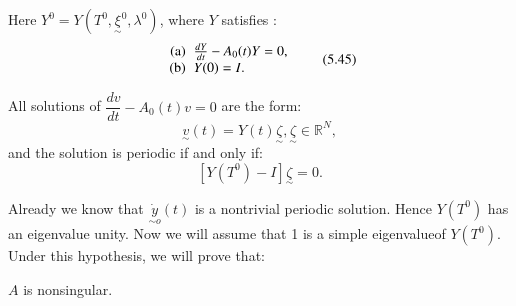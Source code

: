   Here $Y^0 =Y(T^0, \underset{\sim}{\xi}^0, \lambda^0)$, where $Y$
  satisfies : 
  \begin{equation*}
\begin{array}{r@{\;\;}l}
\text{(a)} & \frac{dY}{dt}- A_0(t)Y=0,\\
\text{(b)} & Y(0)=I. 
\end{array}\tag{5.45}\label{chap5-eq5.45}
  \end{equation*}
  
  All solutions of $\dfrac{dv}{dt}- A_0(t) v=0$ are the form: 
  $$
  \underset{\sim}{v}(t)= Y(t)\underset{\sim}{\zeta}, 
  \underset{\sim}{\zeta} \in \mathbb{R}^N,  
  $$
  and the solution is periodic if and only if:
  $$
  [Y(T^0)-I] \underset{\sim}{\zeta}=0.
  $$
 
  Already we know that $\underset{\sim o}{\dot{y}} (t)$ is a
  nontrivial periodic solution. Hence $Y(T^0)$ has an eigenvalue
  unity. Now we will assume that 1 is a simple eigenvalue\pageoriginale of
  $Y(T^0)$. Under this hypothesis, we will prove that: 
  

\begin{chaplemma}\label{chap5-lem5.46}%
$A$ is nonsingular. 
\end{chaplemma}

